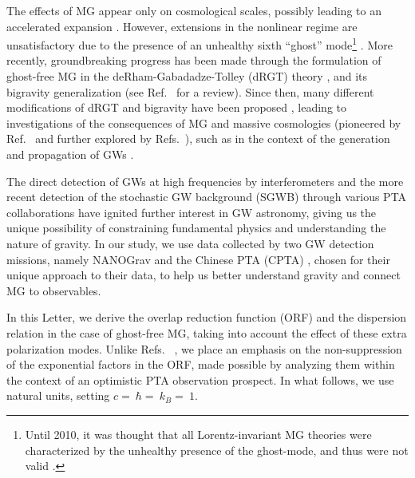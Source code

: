 \documentclass[prd,twocolumn,aps,psfig,nofootinbib,nobibnotes,superscriptaddress,preprintnumbers,times]{revtex4-2}
\begin{document}
The effects of MG appear only on cosmological scales, possibly leading to an accelerated expansion \cite{DAmico:2011eto}.
However, extensions in the nonlinear regime are unsatisfactory due to the presence of an unhealthy sixth ``ghost'' mode\footnote{Until 2010, it was thought that all Lorentz-invariant MG theories were characterized by the unhealthy presence of the ghost-mode, and thus were not valid \cite{deRham:2010kj}.} \cite{Boulware:1972yco}.
More recently, groundbreaking progress has been made through the formulation of ghost-free MG in the deRham-Gabadadze-Tolley (dRGT) theory \cite{deRham:2010ik,deRham:2010kj}, and its bigravity generalization \cite{Hassan:2011zd} (see Ref.~\cite{deRham:2023ngf} for a review). Since then, many different modifications of dRGT and bigravity have been proposed \cite{Hinterbichler:2011tt,deRham:2014zqa,Koyama:2015vza,deRham:2016nuf,Hinterbichler:2016try, Cusin:2016ytz, Kenna-Allison:2019tbu, Kazempour:2022giy},  
leading to investigations of the consequences of MG and massive cosmologies (pioneered by Ref.~\cite{DAmico:2011eto} and further explored by Refs.~\cite{Gratia:2012wt,Gumrukcuoglu:2012aa,Maeda:2013bha,Akrami:2013pna,Zhang:2013noa,Lambiase:2012fv,Koyama:2011wx,Tasinato:2012ze, Solomon:2014iwa, Akrami:2013ffa,Koennig:2014ods,Gumrukcuoglu:2016hic, Heisenberg:2024uwq, Smirnov:2025yru, Comelli:2013tja}),
such as in the context of the generation and propagation of GWs \cite{DeFelice:2013awa,Gumrukcuoglu:2013nza,DeFelice:2013bxa,DeFelice:2015moy,Babichev:2015xha,Sakstein:2017bws}. 

The direct detection of GWs at high frequencies by interferometers \cite{LIGOScientific:2016aoc,LIGOScientific:2016sjg, KAGRA:2020agh, VIRGO:2014yos} and the more recent detection of the stochastic GW background (SGWB) through various PTA collaborations \cite{Agazie:2023, Xu:2023wog,EPTA:2023sfo,EPTA:2023akd,EPTA:2023fyk, Zic:2023gta,Reardon:2023gzh} have ignited further interest in GW astronomy, giving us the unique possibility of constraining fundamental physics and understanding the nature of gravity. 
In our study, we use data collected by two GW detection missions, namely NANOGrav \cite{Agazie:2023} and the Chinese PTA (CPTA) \cite{Xu:2023wog}, chosen for their unique approach to their data, to help us better understand gravity and connect MG to observables. 


In this Letter, we derive the overlap reduction function (ORF) and the dispersion relation in the case of ghost-free MG, taking into account the effect of these extra polarization modes.
Unlike Refs. ~\cite{Liang:2021bct, Anholm:2008wy, Arjona:2024cex, Lee:2013awh}, we place an emphasis on the non-suppression of the exponential factors in the ORF, made possible by analyzing them within the context of an optimistic PTA observation prospect. In what follows, we use natural units, setting $c = $$\ \hbar = $$\ k_B = $$\ 1$.
\end{document}
